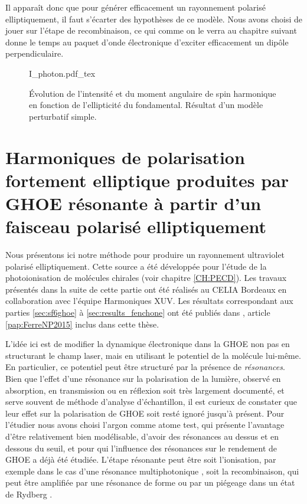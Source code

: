 Il apparaît donc que pour générer efficacement un rayonnement polarisé elliptiquement, il faut s'écarter des hypothèses de ce modèle. Nous avons choisi de jouer sur l'étape de recombinaison, ce qui comme on le verra au chapitre suivant donne le temps au paquet d'onde électronique d'exciter efficacement un dipôle perpendiculaire. 

\begin{figure}[!ht]
\centering
\def\svgwidth{1\columnwidth}
{I_photon.pdf_tex}
\caption{\'Evolution de l'intensité et du moment angulaire de spin harmonique en fonction de l'ellipticité du fondamental. Résultat d'un modèle perturbatif simple.}
\label{fig:mas_photon}
\end{figure}

\chapter[Harmoniques de polarisation fortement elliptique produites par GHOE résonante]{Harmoniques de polarisation fortement elliptique produites par GHOE résonante à partir d'un faisceau polarisé elliptiquement}
\label{CH:Circular_HHG}
Nous présentons ici notre méthode pour produire un rayonnement ultraviolet polarisé elliptiquement. Cette source a été développée pour l'étude de la photoionisation de molécules chirales (voir chapitre \ref{CH:PECD}). Les travaux présentés dans la suite de cette partie ont été réalisés au CELIA Bordeaux en collaboration avec l'équipe Harmoniques XUV. Les résultats correspondant aux parties \ref{sec:sf6ghoe} à \ref{sec:results_fenchone} ont été publiés dans , article \ref{pap:FerreNP2015} inclus dans cette thèse.

L'idée ici est de modifier la dynamique électronique dans la GHOE non pas en structurant le champ laser, mais en utilisant le potentiel de la molécule lui-même. En particulier, ce potentiel peut être structuré par la présence de \textit{résonances}. Bien que l'effet d'une résonance sur la polarisation de la lumière, observé en absorption, en transmission ou en réflexion soit très largement documenté, et serve souvent de méthode d'analyse d'échantillon, il est curieux de constater que leur effet sur la polarisation de GHOE soit resté ignoré jusqu'à présent. Pour l'étudier nous avons choisi l'argon comme atome test, qui présente l'avantage d'être relativement bien modélisable, d'avoir des résonances au dessus et en dessous du seuil, et pour qui l'influence des résonances sur le rendement de GHOE a déjà été étudiée. L'étape résonante peut être soit l'ionisation, par exemple dans le cas d'une résonance multiphotonique , soit la recombinaison, qui peut être amplifiée par une résonance de forme ou par un piégeage dans un état de Rydberg .

